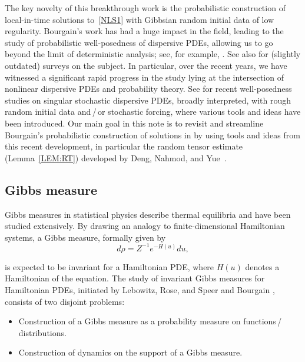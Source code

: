 \documentclass[%
11pt,  reqno]{amsart}
\newcommand{\1}{\hspace{0.2mm}\text{I}\hspace{0.2mm}}
\newcommand{\noi}{\noindent}
\numberwithin{equation}{section}
\numberwithin{theorem}{section}
\begin{document}
\noi
The key novelty of this breakthrough work  %
is the  probabilistic construction
of local-in-time solutions
to~\eqref{NLS1} with Gibbsian random initial data of low regularity.
Bourgain's work has had a huge impact in the field, 
leading to the study of probabilistic well-posedness
of dispersive PDEs, allowing us to go beyond
the limit of deterministic analysis;
see, for example, 
\cite{BT1, BT2, CO, BT3, LM, BOP2, Poc}.
See also  \cite{BOP4, Tzv1}
for (slightly outdated) surveys on the subject.
In particular, 
over the recent years, 
we have witnessed a significant rapid progress
in the study 
lying 
at the intersection of nonlinear dispersive PDEs
and  probability theory.
See 
\cite{OTh2, GKO, GKO2, Bring0, DNY2, DNY3, OOT1, Bring1,DNY4,  OOT2, BDNY}
for 
 recent well-posedness studies
on singular stochastic 
 dispersive PDEs, broadly interpreted, with 
rough random initial data and\,/\,or 
stochastic forcing, 
where various tools and ideas have been introduced.
Our main goal in this note
is to revisit
and streamline Bourgain's probabilistic construction 
of solutions in \cite{BO96} %
by using 
tools and ideas 
from this recent development, 
in particular 
the random
tensor estimate (Lemma~\ref{LEM:RT}) developed
by Deng, Nahmod, and Yue~\cite{DNY3}.






\subsection{Gibbs measure}
Gibbs measures in statistical physics
describe  thermal equilibria
and have been studied extensively.
By drawing an analogy to finite-dimensional Hamiltonian systems, 
a  Gibbs measure, formally given by 
\begin{equation} 
d \rho = Z^{-1}e^{- H(u)}  d u, 
\label{Gibbs1}
\end{equation}


\noi
is expected to be  invariant  for a Hamiltonian PDE,  
where  $H(u)$ denotes a Hamiltonian of the equation.
\noi
The study of invariant Gibbs measures
for Hamiltonian PDEs, 
initiated by 
Lebowitz, Rose, and Speer \cite{LRS}
and Bourgain
\cite{BO94, BO96}, 
consists of two disjoint problems:

\smallskip

\begin{itemize}
\item[(i)]
Construction of a Gibbs measure 
as a probability measure on functions\,/\,distributions.

\vspace{1mm}

\item[(ii)]
Construction of dynamics on the support of a Gibbs measure.

\end{itemize}
\end{document}
